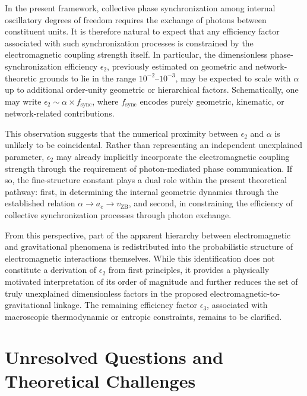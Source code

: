 \documentclass[12pt,letterpaper]{article}
\begin{document}
In the present framework, collective phase synchronization among internal oscillatory degrees of freedom requires the exchange of photons between constituent units. It is therefore natural to expect that any efficiency factor associated with such synchronization processes is constrained by the electromagnetic coupling strength itself. In particular, the dimensionless phase-synchronization efficiency $\epsilon_2$, previously estimated on geometric and network-theoretic grounds to lie in the range $10^{-2}$--$10^{-3}$, may be expected to scale with $\alpha$ up to additional order-unity geometric or hierarchical factors. Schematically, one may write $\epsilon_2 \sim \alpha \times f_{\mathrm{sync}}$, where $f_{\mathrm{sync}}$ encodes purely geometric, kinematic, or network-related contributions.

This observation suggests that the numerical proximity between $\epsilon_2$ and $\alpha$ is unlikely to be coincidental. Rather than representing an independent unexplained parameter, $\epsilon_2$ may already implicitly incorporate the electromagnetic coupling strength through the requirement of photon-mediated phase communication. If so, the fine-structure constant plays a dual role within the present theoretical pathway: first, in determining the internal geometric dynamics through the established relation $\alpha \rightarrow a_e \rightarrow v_{\mathrm{ZB}}$, and second, in constraining the efficiency of collective synchronization processes through photon exchange.

From this perspective, part of the apparent hierarchy between electromagnetic and gravitational phenomena is redistributed into the probabilistic structure of electromagnetic interactions themselves. While this identification does not constitute a derivation of $\epsilon_2$ from first principles, it provides a physically motivated interpretation of its order of magnitude and further reduces the set of truly unexplained dimensionless factors in the proposed electromagnetic-to-gravitational linkage. The remaining efficiency factor $\epsilon_3$, associated with macroscopic thermodynamic or entropic constraints, remains to be clarified.


\section{Unresolved Questions and Theoretical Challenges}
\label{sec:challenges}
\end{document}
